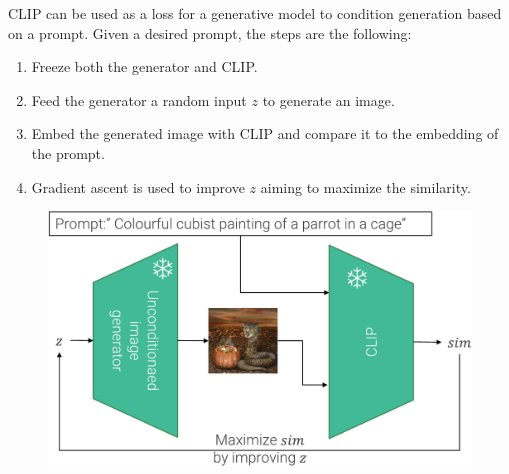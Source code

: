 \begin{remark}
    CLIP can be used as a loss for a generative model to condition generation based on a prompt. Given a desired prompt, the steps are the following:
    \begin{enumerate}
        \item Freeze both the generator and CLIP.
        \item Feed the generator a random input $z$ to generate an image.
        \item Embed the generated image with CLIP and compare it to the embedding of the prompt.
        \item Gradient ascent is used to improve $z$ aiming to maximize the similarity.
    \end{enumerate}

    \begin{figure}[H]
        \centering
        \includegraphics[width=0.5\linewidth]{./img/_clip_generation_conditioning.pdf}
    \end{figure}
\end{remark}